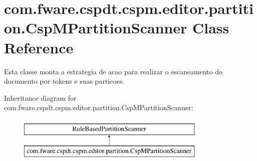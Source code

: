 \hypertarget{classcom_1_1fware_1_1cspdt_1_1cspm_1_1editor_1_1partition_1_1_csp_m_partition_scanner}{}\section{com.\+fware.\+cspdt.\+cspm.\+editor.\+partition.\+Csp\+M\+Partition\+Scanner Class Reference}
\label{classcom_1_1fware_1_1cspdt_1_1cspm_1_1editor_1_1partition_1_1_csp_m_partition_scanner}


Esta classe monta a estrategia de acao para realizar o escaneamento do documento por tokens e suas particoes.  


Inheritance diagram for com.\+fware.\+cspdt.\+cspm.\+editor.\+partition.\+Csp\+M\+Partition\+Scanner\+:\begin{figure}[H]
\begin{center}
\leavevmode
\includegraphics[height=2.000000cm]{classcom_1_1fware_1_1cspdt_1_1cspm_1_1editor_1_1partition_1_1_csp_m_partition_scanner}
\end{center}
\end{figure}
